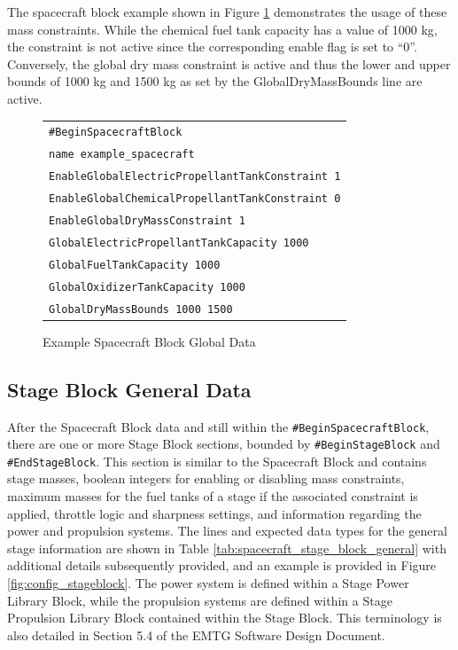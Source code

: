 The spacecraft block example shown in Figure \ref{fig:config_spacecraftblock} demonstrates the usage of these mass constraints. While the chemical fuel tank capacity has a value of 1000 kg, the constraint is not active since the corresponding enable flag is set to ``0''. Conversely, the global dry mass constraint is active and thus the lower and upper bounds of 1000 kg and 1500 kg as set by the GlobalDryMassBounds line are active.


\begin{figure}[htb]
    \centering
    \begin{tabular}{|l|}
        \hline
        {\tt \#BeginSpacecraftBlock} \\
        {\tt name example\_spacecraft} \\
        {\tt EnableGlobalElectricPropellantTankConstraint 1} \\
        {\tt EnableGlobalChemicalPropellantTankConstraint 0} \\
        {\tt EnableGlobalDryMassConstraint 1} \\
        {\tt GlobalElectricPropellantTankCapacity 1000} \\
        {\tt GlobalFuelTankCapacity 1000} \\
        {\tt GlobalOxidizerTankCapacity 1000} \\
        {\tt GlobalDryMassBounds 1000 1500} \\
        \hline
    \end{tabular}
    \caption{Example Spacecraft Block Global Data}
    \label{fig:config_spacecraftblock}
\end{figure}


\subsection{Stage Block General Data}
\label{sec:stage_block_data}
After the Spacecraft Block data and still within the {\tt \#BeginSpacecraftBlock}, there are one or more Stage Block sections, bounded by {\tt \#BeginStageBlock} and {\tt \#EndStageBlock}. This section is similar to the Spacecraft Block and contains stage masses, boolean integers for enabling or disabling mass constraints, maximum masses for the fuel tanks of a stage if the associated constraint is applied, throttle logic and sharpness settings, and information regarding the power and propulsion systems. The lines and expected data types for the general stage information are shown in Table \ref{tab:spacecraft_stage_block_general} with additional details subsequently provided, and an example is provided in Figure \ref{fig:config_stageblock}. The power system is defined within a Stage Power Library Block, while the propulsion systems are defined within a Stage Propulsion Library Block contained within the Stage Block. This terminology is also detailed in Section 5.4 of the \ac{EMTG} Software Design Document.

